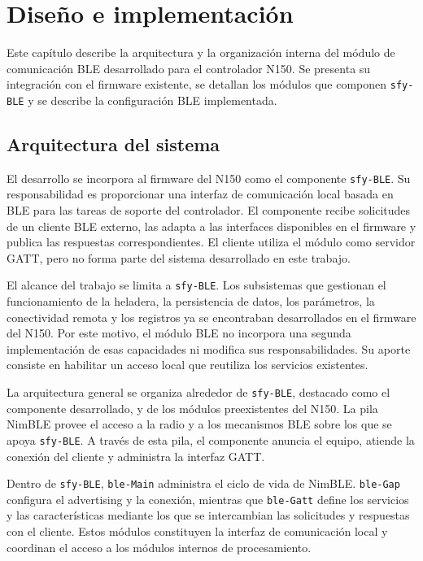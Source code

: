 \chapter{Diseño e implementación}
\label{Chapter3}

Este capítulo describe la arquitectura y la organización interna del módulo de comunicación BLE desarrollado para el controlador N150. Se presenta su integración con el firmware existente, se detallan los módulos que componen \texttt{sfy-BLE} y se describe la configuración BLE implementada.


\section{Arquitectura del sistema}
\label{sec:arquitectura_sistema}

El desarrollo se incorpora al firmware del N150 como el componente \texttt{sfy-BLE}. Su responsabilidad es proporcionar una interfaz de comunicación local basada en BLE para las tareas de soporte del controlador. El componente recibe solicitudes de un cliente BLE externo, las adapta a las interfaces disponibles en el firmware y publica las respuestas correspondientes. El cliente utiliza el módulo como servidor GATT, pero no forma parte del sistema desarrollado en este trabajo.

El alcance del trabajo se limita a \texttt{sfy-BLE}. Los subsistemas que gestionan el funcionamiento de la heladera, la persistencia de datos, los parámetros, la conectividad remota y los registros ya se encontraban desarrollados en el firmware del N150. Por este motivo, el módulo BLE no incorpora una segunda implementación de esas capacidades ni modifica sus responsabilidades. Su aporte consiste en habilitar un acceso local que reutiliza los servicios existentes.

La arquitectura general se organiza alrededor de \texttt{sfy-BLE}, destacado como el componente desarrollado, y de los módulos preexistentes del N150. La pila NimBLE provee el acceso a la radio y a los mecanismos BLE sobre los que se apoya \texttt{sfy-BLE}. A través de esta pila, el componente anuncia el equipo, atiende la conexión del cliente y administra la interfaz GATT.

Dentro de \texttt{sfy-BLE}, \texttt{ble-Main} administra el ciclo de vida de NimBLE. \texttt{ble-Gap} configura el advertising y la conexión, mientras que \texttt{ble-Gatt} define los servicios y las características mediante los que se intercambian las solicitudes y respuestas con el cliente. Estos módulos constituyen la interfaz de comunicación local y coordinan el acceso a los módulos internos de procesamiento.

